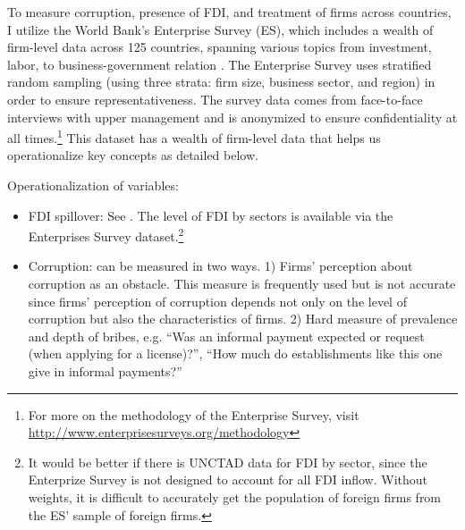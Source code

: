 To measure corruption, presence of FDI, and treatment of firms across countries, I utilize the World Bank's Enterprise Survey (ES), which includes a wealth of firm-level data across 125 countries, spanning various topics from investment, labor, to business-government relation \citep{WorldBank2015}. The Enterprise Survey uses stratified random sampling (using three strata: firm size, business sector, and region) in order to ensure representativeness. The survey data comes from face-to-face interviews with upper management and is anonymized to ensure confidentiality at all times.\footnote{For more on the methodology of the Enterprise Survey, visit \url{http://www.enterprisesurveys.org/methodology}} This dataset has a wealth of firm-level data that helps us operationalize key concepts as detailed below.

Operationalization of variables:
\begin{itemize}
\item FDI spillover: See . The level of FDI by sectors is available via the Enterprises Survey dataset.\footnote{It would be better if there is UNCTAD data for FDI by sector, since the Enterprize Survey is not designed to account for all FDI inflow. Without weights, it is difficult to accurately get the population of foreign firms from the ES' sample of foreign firms.}

\item Corruption: can be measured in two ways. 1) Firms' perception about corruption as an obstacle. This measure is frequently used but is not accurate since firms' perception of corruption depends not only on the level of corruption but also the characteristics of firms. 2) Hard measure of prevalence and depth of bribes, e.g. ``Was an informal payment expected or request (when applying for a license)?'', ``How much do establishments like this one give in informal payments?'' 
\end{itemize}